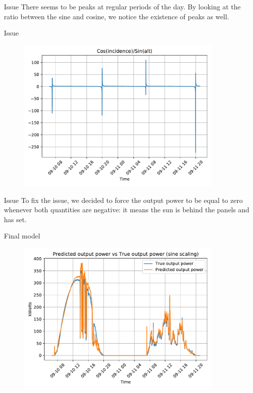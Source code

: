 \documentclass[12pt]{beamer}
\begin{document}
\begin{frame}{Issue}
    There seems to be peaks at regular periods of the day. By looking at the ratio between the sine and cosine, we notice the existence of peaks as well.
\end{frame}

\begin{frame}{Issue}
    \begin{figure}
        \centering
        \includegraphics[width=0.9\textwidth]{resources/pdf/cosDIVsin.pdf}
    \end{figure}
\end{frame}

\begin{frame}{Issue}
    To fix the issue, we decided to force the output power to be equal to zero whenever both quantities are negative: it means the sun is \og{}behind\fg{} the panels and has set.
\end{frame}

\begin{frame}{Final model}
    \begin{figure}
        \centering
        \includegraphics[width=0.9\textwidth]{resources/pdf/final.pdf}
    \end{figure}
\end{frame}
\end{document}
